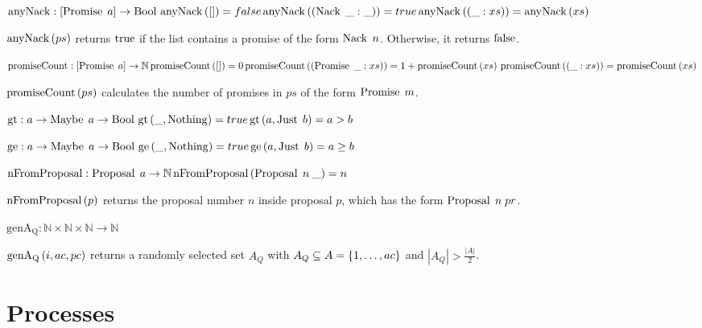 $\operatorname{anyNack} : [\operatorname{Promise}\; a] \to \operatorname{Bool}\\
\operatorname{anyNack}\left([]\right) = false\\
\operatorname{anyNack}\left(\left(\operatorname{Nack}\; \_: \_\right)\right) = true\\
\operatorname{anyNack}\left(\left(\_:xs\right)\right) = \operatorname{anyNack}\left(xs\right)$

$\operatorname{anyNack}\left(ps\right)$ returns $\operatorname{true}$ if the list contains a promise of the form $\operatorname{Nack}\; n$. Otherwise, it returns $\operatorname{false}$.

$\operatorname{promiseCount} : [\operatorname{Promise}\; a] \to \mathbb{N}\\
\operatorname{promiseCount}\left([]\right) = 0\\
\operatorname{promiseCount}\left(\left(\operatorname{Promise}\; \_:xs\right)\right) = 1 + \operatorname{promiseCount}\left(xs\right)\\
\operatorname{promiseCount}\left(\left(\_:xs\right)\right) = \operatorname{promiseCount}\left(xs\right)$

$\operatorname{promiseCount}\left(ps\right)$ calculates the number of promises in $ps$ of the form $\operatorname{Promise}\; m$.

$\operatorname{gt}: a \to \operatorname{Maybe}\; a \to \operatorname{Bool}\\
\operatorname{gt}\left(\_, \operatorname{Nothing}\right) = true\\
\operatorname{gt}\left(a, \operatorname{Just}\; b\right) = a > b$

$\operatorname{ge}: a \to \operatorname{Maybe}\; a \to \operatorname{Bool}\\
\operatorname{ge}\left(\_, \operatorname{Nothing}\right) = true\\
\operatorname{ge}\left(a, \operatorname{Just}\; b\right) = a \ge b$

$\operatorname{nFromProposal} : \operatorname{Proposal}\; a \to \mathbb{N}\\
\operatorname{nFromProposal}\left(\operatorname{Proposal}\; n\; \_ \right) = n$

$\operatorname{nFromProposal}\left(p \right)$ returns the proposal number $n$ inside proposal $p$, which has the form $\operatorname{Proposal}\; n\; pr$.

$\operatorname{genA_Q} : \mathbb{N} \times \mathbb{N} \times \mathbb{N} \to \mathbb{N}$

$\operatorname{genA_Q}\left(i, ac, pc\right)$ returns a randomly selected set $A_Q$ with $A_Q \subseteq A = \left\{1, \dots, ac\right\}$ and $|A_Q| > \frac{|A|}{2}$.

\section{Processes}
\newcommand{\Sys}[2]{\operatorname{Sys}\left(#1, #2\right)}
\newcommand{\Pa}[0]{\operatorname{P^a}}
\newcommand{\Pp}[0]{\operatorname{P^p}}
\newcommand{\PaCont}[0]{\operatorname{P^a_{cont}}}

\newcommand{\PpInit}[5]{\operatorname{P^p_{init}}\left(#1, #2, #3, #4, #5\right)}
\newcommand{\PaInit}[6]{\operatorname{P^a_{init}}\left(#1, #2, #3, #4, #5, #6\right)}

